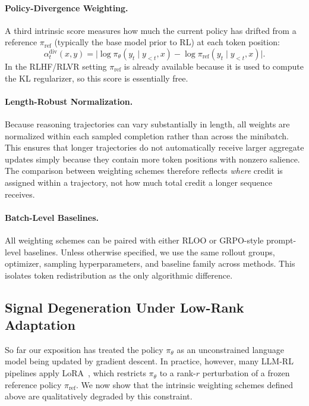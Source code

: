 \paragraph{Policy-Divergence Weighting.}
A third intrinsic score measures how much the current policy has drifted from
a reference $\pi_{\mathrm{ref}}$ (typically the base model prior to RL) at
each token position:
\begin{equation}
\alpha_t^{\mathrm{div}}(x,y) = \lvert \log \pi_\theta(y_t \mid y_{<t}, x) -
\log \pi_{\mathrm{ref}}(y_t \mid y_{<t}, x) \rvert.
\end{equation}
In the RLHF/RLVR setting $\pi_{\mathrm{ref}}$ is already available because
it is used to compute the KL regularizer, so this score is essentially free.

\paragraph{Length-Robust Normalization.}
Because reasoning trajectories can vary substantially in length, all weights are
normalized within each sampled completion rather than across the minibatch. This ensures
that longer trajectories do not automatically receive larger aggregate updates simply
because they contain more token positions with nonzero salience. The comparison between
weighting schemes therefore reflects \emph{where} credit is assigned within a
trajectory, not how much total credit a longer sequence receives.

\paragraph{Batch-Level Baselines.}
All weighting schemes can be paired with either RLOO or GRPO-style prompt-level
baselines. Unless otherwise specified, we use the same rollout groups, optimizer,
sampling hyperparameters, and baseline family across methods. This isolates token
redistribution as the only algorithmic difference.

\subsection{Signal Degeneration Under Low-Rank Adaptation}\label{sec:collapse}

So far our exposition has treated the policy $\pi_\theta$ as an unconstrained
language model being updated by gradient descent. In practice, however, many
LLM-RL pipelines apply LoRA~\citep{hu2021lora}, which restricts
$\pi_\theta$ to a rank-$r$ perturbation of a frozen reference policy
$\pi_{\mathrm{ref}}$. We now show that the intrinsic weighting schemes defined
above are qualitatively degraded by this constraint.

